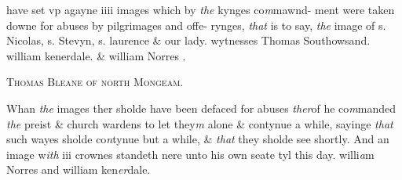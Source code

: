 \documentclass[12pt, a4paper]{book}
\begin{document}
            		
		\ifthenelse{\isodd{\thepage}}
		{\reversemarginpar}
		{\normalmarginpar}
		 have set vp agayne iiii images which by \textit{the} kynges co\textit{m}mawnd-
 ment were taken downe for abuses by pilgrimages and offe-
 rynges, \textit{that} is to say, \textit{the} image of s. Nicolas, s. Stevyn, s.
 laurence \& our lady. wytnesses Thomas Southowsand.
            			william kenerdale. \& william Norres .
 

            
            	
				\begin{center} \begin{large} {\scshape Thomas Bleane of north Mongeam.} \end{large} \end{center}
			

            	
				\marginpar[\vspace{0.5cm}{\textcolor{Gray}{Images}}]{}
			
            		
				\marginpar[\vspace{0.5cm}{\textcolor{Gray}{n+}}]{}
			
            		
		\ifthenelse{\isodd{\thepage}}
		{\reversemarginpar}
		{\normalmarginpar}
		Whan \textit{the} images ther sholde have been defaced for abuses \textit{ther}of
 he co\textit{m}manded \textit{the} preist \& church wardens to let they\textit{m} alone
 \& contynue a while, sayinge \textit{that} such wayes sholde co\textit{n}tynue but
 a while, \& \textit{that} they sholde see shortly. And an image w\textit{ith} iii
 crownes standeth nere unto his own seate tyl this day.
            			willi\textit{a}m Norres and william ken\textit{er}dale.


            
\dotfill
					  \subsection*{}  \subsection*{}  \subsection*{}  \subsection*{}  \subsection*{}
\end{document}

